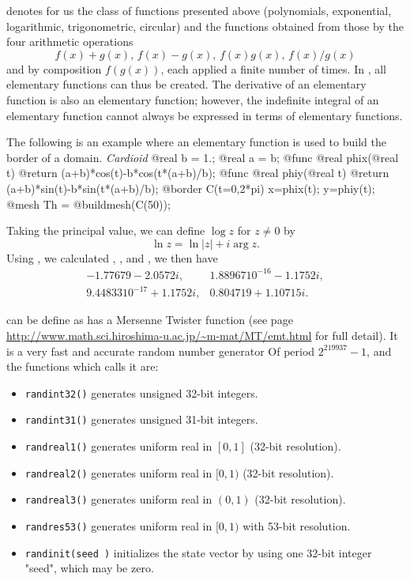 \documentclass[a4paper,twoside,12pt]{book}
\begin{document}
\begin{description}
 denotes for us  the class of functions presented above
(polynomials, exponential, logarithmic, trigonometric, circular) and
the functions obtained from those by the four arithmetic operations
\[
f(x)+g(x),\, f(x)-g(x),\, f(x)g(x),\, f(x)/g(x)
\]
and by composition $f(g(x))$, each applied a finite number of times.
In \freefempp,  all elementary functions can thus be created.
The derivative of an elementary function is also an elementary function;
however, the indefinite integral of an elementary function cannot always be expressed in terms of elementary functions.
\begin{example}
The following is an example
where an  elementary function is used to build the border of a domain.
\emph{Cardioid}
\bFF
@real b = 1.;
@real a = b;
@func @real phix(@real t)
{
   @return (a+b)*cos(t)-b*cos(t*(a+b)/b);
}
@func @real phiy(@real t)
{
   @return (a+b)*sin(t)-b*sin(t*(a+b)/b);
}
@border C(t=0,2*pi) { x=phix(t); y=phiy(t); }
@mesh Th = @buildmesh(C(50));
\eFF
\end{example}
Taking the principal value, we can define $\log z$ for $z\neq 0$ by
\[
\ln z = \ln |z|+i \arg z.
\]
Using \freefempp, we calculated
, ,  and , we then have
\begin{eqnarray*}
-1.77679-2.0572i,& 1.88967 10^{-16}-1.1752i,\\
9.44833 10^{-17}+1.1752i, & 0.804719+1.10715i.
\end{eqnarray*}

 can be define as \freefempp has a Mersenne Twister function (see page \url{http://www.math.sci.hiroshima-u.ac.jp/~m-mat/MT/emt.html}
for full detail).
It is a very fast  and accurate random number generator
Of period $2^{219937}-1$, and the functions which calls it are:
\begin{itemize}
\item {\verb!randint32()!}  generates unsigned 32-bit integers.
\item {\verb!randint31()!} generates unsigned 31-bit integers.
\item {\verb!randreal1()!} generates uniform real in $[0,1]$ (32-bit resolution).
\item {\verb!randreal2()!} generates uniform real in $[0,1)$ (32-bit resolution).
\item {\verb!randreal3()!} generates uniform real in $(0,1)$ (32-bit resolution).
\item {\verb!randres53()!} generates uniform real in $[0,1)$ with 53-bit resolution.
\item {\verb!randinit(seed )!} initializes the state vector by using one  32-bit integer "seed", which may be zero.
\end{itemize}


\end{description}
\end{document}
